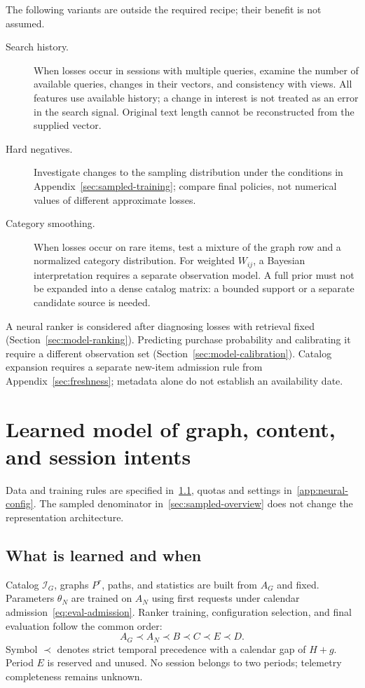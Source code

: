 \documentclass[12pt,a4paper]{article}
\theoremstyle{plainru}
\begin{document}
The following variants are outside the required recipe; their
benefit is not assumed.
\begin{description}
\item[Search history.]
When losses occur in sessions with multiple queries, examine the number of
available queries, changes in their vectors, and consistency with views.
All features use available history; a change in interest
is not treated as an error in the search signal. Original text length
cannot be reconstructed from the supplied vector.
\item[Hard negatives.]
Investigate changes to the sampling distribution under the conditions in
Appendix~\ref{sec:sampled-training}; compare final policies,
not numerical values of different approximate losses.
\item[Category smoothing.]
When losses occur on rare items, test a mixture of the graph row
and a normalized category distribution. For weighted $W_{ij}$,
a Bayesian interpretation requires a separate observation model.
A full prior must not be expanded into a dense catalog matrix:
a bounded support or a separate candidate source is needed.
\end{description}

A neural ranker is considered after diagnosing losses
with retrieval fixed (Section~\ref{sec:model-ranking}).
Predicting purchase probability and calibrating it require a different observation
set (Section~\ref{sec:model-calibration}).
Catalog expansion requires a separate new-item admission rule
from Appendix~\ref{sec:freshness}; metadata alone do not establish an availability date.

\section{Learned model of graph, content, and session intents}
\label{sec:modern-model}

Data and training rules are specified in~\ref{sec:modern-time}, quotas
and settings in~\ref{app:neural-config}.
The sampled denominator in~\ref{sec:sampled-overview}
does not change the representation architecture.

\subsection{What is learned and when}
\label{sec:modern-time}

Catalog $\mathcal I_G$, graphs $P^r$, paths, and statistics are built from $A_G$
and fixed. Parameters $\theta_N$ are trained on $A_N$ using first requests
under calendar admission~\eqref{eq:eval-admission}. Ranker training,
configuration selection, and final evaluation follow the common order:
\begin{equation}\label{eq:modern-periods}
A_G\prec A_N\prec B\prec C\prec E\prec D.
\end{equation}
Symbol $\prec$ denotes strict temporal precedence with a calendar
gap of $H+g$. Period $E$ is reserved and unused.
No session belongs to two periods; telemetry completeness remains unknown.
\end{document}
